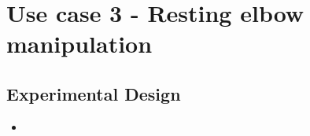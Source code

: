 \documentclass[report.tex]{subfiles}
\begin{document}
    \section{Use case 3 - Resting elbow manipulation}
        \subsection{Experimental Design}
        \begin{itemize}
            \item 
        \end{itemize} 








\end{document}
